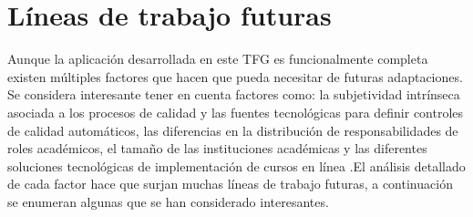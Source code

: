 \section{Líneas de trabajo futuras}
Aunque la aplicación desarrollada en este TFG es funcionalmente completa existen múltiples factores que hacen que pueda necesitar de futuras adaptaciones. Se considera interesante tener en cuenta factores como: la subjetividad intrínseca asociada a los procesos de calidad y las fuentes tecnológicas para definir controles de calidad automáticos, las diferencias en la distribución de responsabilidades de roles académicos, el tamaño de las instituciones académicas y las diferentes soluciones tecnológicas de implementación de cursos en línea .El análisis detallado de cada factor hace que surjan muchas líneas de trabajo futuras, a continuación se enumeran algunas que se han considerado interesantes.
